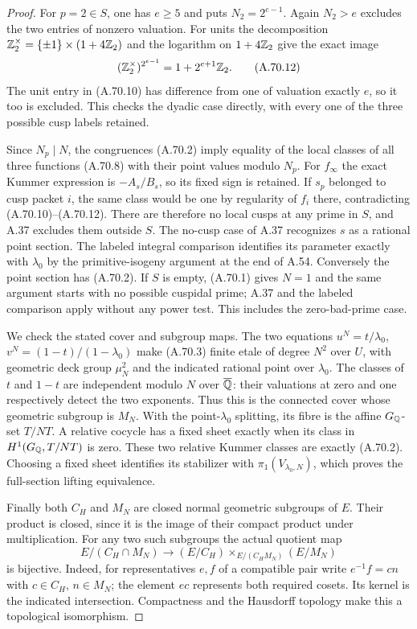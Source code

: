 \begin{proof}
For $p=2\in S$, one has $e\ge5$ and puts
$N_2=2^{e-1}$.
Again $N_2>e$ excludes the two entries of nonzero
valuation.  For units the decomposition
$\mathbb Z_2^\times=\{\pm1\}\times(1+4\mathbb Z_2)$ and
the logarithm on $1+4\mathbb Z_2$ give the exact image
\[
                  (\mathbb Z_2^\times)^{2^{e-1}}
                              =1+2^{e+1}\mathbb Z_2.
\tag{A.70.12}
\]
The unit entry in (A.70.10) has difference from one
of valuation exactly $e$, so it too is excluded.
This checks the dyadic case directly, with every
one of the three possible cusp labels retained.

Since $N_p\mid N$, the congruences (A.70.2)
imply equality of the local classes of all three
functions (A.70.8) with their point values modulo
$N_p$.  For $f_\infty$ the exact Kummer expression
is $-A_s/B_s$, so its fixed sign is retained.
If $s_p$ belonged to cusp packet $i$, the same
class would be one by regularity of $f_i$ there,
contradicting (A.70.10)--(A.70.12).
There are therefore no local cusps at any prime
in $S$, and A.37 excludes them outside $S$.
The no-cusp case of A.37 recognizes $s$ as a
rational point section.  The labeled integral
comparison identifies its parameter exactly with
$\lambda_0$ by the primitive-isogeny argument
at the end of A.54.
Conversely the point section has (A.70.2).
If $S$ is empty, (A.70.1) gives $N=1$ and the
same argument starts with no possible cuspidal
prime; A.37 and the labeled comparison apply
without any power test.  This includes the
zero-bad-prime case.

We check the stated cover and subgroup maps.
The two equations
$u^N=t/\lambda_0$, $v^N=(1-t)/(1-\lambda_0)$
make (A.70.3) finite etale of degree $N^2$ over
$U$, with geometric deck group $\mu_N^2$ and
the indicated rational point over $\lambda_0$.
The classes of $t$ and $1-t$ are independent
modulo $N$ over $\overline{\mathbb Q}$: their valuations
at zero and one respectively detect the two
exponents.  Thus this is the connected cover
whose geometric subgroup is $M_N$.
With the point-$\lambda_0$ splitting, its fibre
is the affine $G_\mathbb Q$-set $T/NT$.
A relative cocycle has a fixed sheet exactly
when its class in $H^1(G_\mathbb Q,T/NT)$ is zero.
These two relative Kummer classes are exactly
(A.70.2).  Choosing a fixed sheet identifies its
stabilizer with $\pi_1(V_{\lambda_0,N})$, which
proves the full-section lifting equivalence.

Finally both $C_H$ and $M_N$ are closed normal
geometric subgroups of $E$.  Their product is
closed, since it is the image of their compact
product under multiplication.
For any two such subgroups the actual quotient map
\[
 E/(C_H\cap M_N)\longrightarrow
          (E/C_H)\mathbin{\times}_{E/(C_HM_N)}(E/M_N)
\tag{A.70.13}
\]
is bijective.  Indeed, for representatives $e,f$
of a compatible pair write $e^{-1}f=cn$ with
$c\in C_H$, $n\in M_N$; the element $ec$
represents both required cosets.  Its kernel is
the indicated intersection.  Compactness and the
Hausdorff topology make this a topological
isomorphism.


\end{proof}
